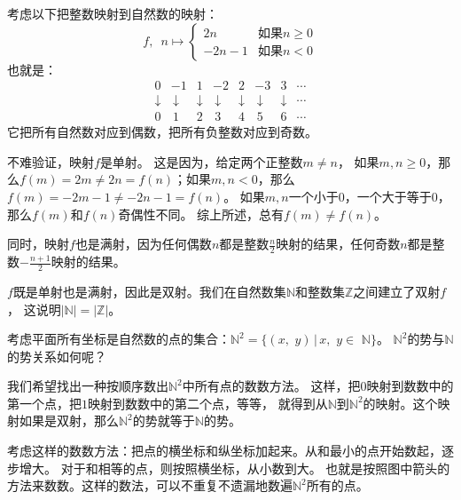 \documentclass[12pt,UTF8]{ctexbook}
\begin{document}
考虑以下把整数映射到自然数的映射：
$$ f,\,\,\,n\mapsto \left\{
    \begin{array}{cl}
        2n & \mbox{如果}n \geqslant 0 \\
        -2n - 1  & \mbox{如果}n < 0 
    \end{array}\right.
$$
也就是：
$$ \begin{array}{cccccccc}
        0 & -1 & 1 & -2 & 2 & -3 & 3 & \cdots \\
        \downarrow & \,\downarrow & \downarrow & \,\downarrow & \downarrow & \,\downarrow & \downarrow & \cdots \\
        0 & \,1 & 2 & \,3 & 4 & \,5 & 6 & \cdots 
    \end{array}
$$
它把所有自然数对应到偶数，把所有负整数对应到奇数。

不难验证，映射$f$是单射。
这是因为，给定两个正整数$m \neq n$，
如果$m,n\geqslant 0$，那么$f(m) = 2m \neq 2n = f(n)$；如果$m,n< 0$，那么$f(m) = -2m - 1 \neq -2n - 1 = f(n)$。
如果$m,n$一个小于$0$，一个大于等于$0$，那么$f(m)$和$f(n)$奇偶性不同。
综上所述，总有$f(m) \neq f(n)$。

同时，映射$f$也是满射，因为任何偶数$n$都是整数$\frac{n}{2}$映射的结果，任何奇数$n$都是整数$-\frac{n+1}{2}$映射的结果。

$f$既是单射也是满射，因此是双射。我们在自然数集$\mathbb{N}$和整数集$\mathbb{Z}$之间建立了双射$f$，
这说明$|\mathbb{N}| = |\mathbb{Z}|$。

考虑平面所有坐标是自然数的点的集合：$\mathbb{N}^2 = \{(x,\,\,y) \, | \, x, \,\, y \in \,\, \mathbb{N}\}$。
$\mathbb{N}^2$的势与$\mathbb{N}$的势关系如何呢？

我们希望找出一种按顺序数出$\mathbb{N}^2$中所有点的数数方法。
这样，把$0$映射到数数中的第一个点，把$1$映射到数数中的第二个点，等等，
就得到从$\mathbb{N}$到$\mathbb{N}^2$的映射。这个映射如果是双射，那么$\mathbb{N}^2$的势就等于$\mathbb{N}$的势。

考虑这样的数数方法：把点的横坐标和纵坐标加起来。从和最小的点开始数起，逐步增大。
对于和相等的点，则按照横坐标，从小数到大。
也就是按照图中箭头的方法来数数。这样的数法，可以不重复不遗漏地数遍$\mathbb{N}^2$所有的点。
\end{document}
